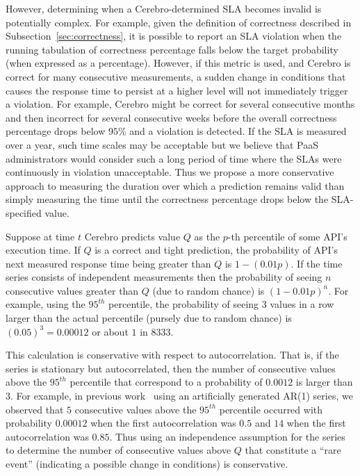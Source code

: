 However, determining when a Cerebro-determined SLA becomes invalid is
potentially complex. For example, given the definition of correctness
described in Subsection~\ref{sec:correctness}, it is possible to report an SLA violation
when the running tabulation of correctness percentage falls below the target
probability (when expressed as a percentage).  However, if this metric is
used, and Cerebro is correct for many consecutive measurements, a sudden
change in conditions that causes the response time to persist at a higher
level will not immediately trigger a violation.  For example, Cerebro might be
correct for several consecutive months and then incorrect for several
consecutive weeks before the overall correctness percentage drops below $95\%$
and a violation is detected.  If the SLA is measured over a year, such time
scales may be acceptable but we believe that PaaS administrators would
consider such a long period of time where the SLAs were continuously in
violation unacceptable.
Thus we propose a more conservative approach to measuring the duration over
which a prediction remains valid than simply measuring the time until the
correctness percentage drops below the SLA-specified value.

Suppose at time $t$ Cerebro predicts value $Q$ as the $p$-th percentile of
some API's execution time.  If $Q$ is a correct and tight prediction,
the probability of API's next measured response time being greater than 
$Q$ is $1-(0.01p)$.  If the time series consists of independent
measurements then the probability of seeing $n$ consecutive values greater
than $Q$ (due to random chance) is $(1-0.01p)^n$. 
For example, using the $95^{th}$ percentile, the probability of seeing $3$
values in a row larger than the actual percentile (pursely due to random chance)
is $(0.05)^3 = 0.00012$ or about $1$ in $8333$.


This calculation is conservative with respect to autocorrelation. That is, if
the series is stationary but autocorrelated, then the number of consecutive 
values above the $95^{th}$ percentile that correspond to a probability of
$0.0012$ is larger than $3$.  For example, in previous
work~\cite{Nurmi:2007:QQB:1791551.1791556} 
using an artificially generated AR(1) series, 
we observed that $5$ consecutive values above the $95^{th}$ percentile
occurred with probability $0.00012$ when the first autocorrelation was $0.5$
and $14$ when the first autocorrelation was $0.85$.  Thus using an independence
assumption for the series to determine the number of consecutive values above
$Q$ that constitute a ``rare event'' (indicating a possible change in
conditions) is conservative.

